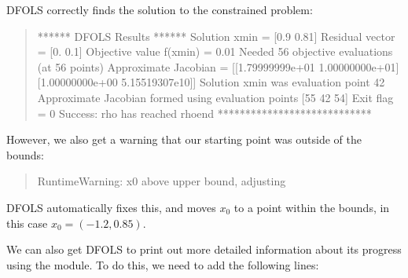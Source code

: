 \documentclass[letterpaper,10pt,english]{sphinxmanual}
\begin{document}
\sphinxAtStartPar
DFO\sphinxhyphen{}LS correctly finds the solution to the constrained problem:
\begin{quote}

\begin{sphinxVerbatim}[commandchars=\\\{\}]
****** DFO\PYGZhy{}LS Results ******
Solution xmin = [0.9  0.81]
Residual vector = [0.  0.1]
Objective value f(xmin) = 0.01
Needed 56 objective evaluations (at 56 points)
Approximate Jacobian = [[\PYGZhy{}1.79999999e+01  1.00000000e+01]
 [\PYGZhy{}1.00000000e+00 \PYGZhy{}5.15519307e\PYGZhy{}10]]
Solution xmin was evaluation point 42
Approximate Jacobian formed using evaluation points [55 42 54]
Exit flag = 0
Success: rho has reached rhoend
****************************
\end{sphinxVerbatim}
\end{quote}

\sphinxAtStartPar
However, we also get a warning that our starting point was outside of the bounds:
\begin{quote}

\begin{sphinxVerbatim}[commandchars=\\\{\}]
RuntimeWarning: x0 above upper bound, adjusting
\end{sphinxVerbatim}
\end{quote}

\sphinxAtStartPar
DFO\sphinxhyphen{}LS automatically fixes this, and moves \(x_0\) to a point within the bounds, in this case \(x_0=(-1.2,0.85)\).

\sphinxAtStartPar
We can also get DFO\sphinxhyphen{}LS to print out more detailed information about its progress using the  module. To do this, we need to add the following lines:
\begin{quote}

\begin{sphinxVerbatim}[commandchars=\\\{\}]
 
 

\end{sphinxVerbatim}
\end{quote}
\end{document}
